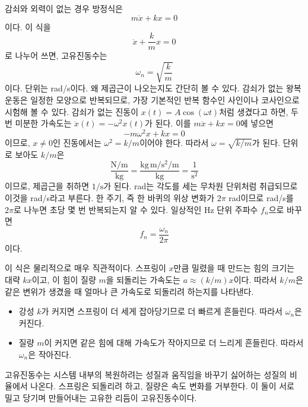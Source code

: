 감쇠와 외력이 없는 경우 방정식은
\begin{equation}
  m\ddot{x}+kx=0
\end{equation}
이다.
이 식을
\begin{equation}
  \ddot{x}+\frac{k}{m}x=0
\end{equation}
로 나누어 쓰면, 고유진동수는
\begin{equation}
  \omega_n=\sqrt{\frac{k}{m}}
\end{equation}
이다.
단위는 rad/s이다.
왜 제곱근이 나오는지도 간단히 볼 수 있다.
감쇠가 없는 왕복 운동은 일정한 모양으로 반복되므로, 가장 기본적인 반복 함수인 사인이나 코사인으로 시험해 볼 수 있다.
감쇠가 없는 진동이 $x(t)=A\cos(\omega t)$처럼 생겼다고 하면, 두 번 미분한 가속도는 $\ddot{x}(t)=-\omega^2x(t)$가 된다.
이를 $m\ddot{x}+kx=0$에 넣으면
\begin{equation}
  -m\omega^2x+kx=0
\end{equation}
이므로, $x\neq0$인 진동에서는 $\omega^2=k/m$이어야 한다.
따라서 $\omega=\sqrt{k/m}$가 된다.
단위로 보아도 $k/m$은
\begin{equation}
  \frac{\mathrm{N/m}}{\mathrm{kg}}
  =
  \frac{\mathrm{kg\,m/s^2}/\mathrm{m}}{\mathrm{kg}}
  =
  \frac{1}{\mathrm{s^2}}
\end{equation}
이므로, 제곱근을 취하면 $1/\mathrm{s}$가 된다.
rad는 각도를 세는 무차원 단위처럼 취급되므로 이것을 rad/s라고 부른다.
한 주기, 즉 한 바퀴의 위상 변화가 $2\pi$ rad이므로 rad/s를 $2\pi$로 나누면 초당 몇 번 반복되는지 알 수 있다.
일상적인 Hz 단위 주파수 $f_n$으로 바꾸면
\begin{equation}
  f_n=\frac{\omega_n}{2\pi}
\end{equation}
이다.

이 식은 물리적으로 매우 직관적이다.
스프링이 $x$만큼 밀렸을 때 만드는 힘의 크기는 대략 $kx$이고, 이 힘이 질량 $m$을 되돌리는 가속도는 $a\approx(k/m)x$이다.
따라서 $k/m$은 같은 변위가 생겼을 때 얼마나 큰 가속도로 되돌리려 하는지를 나타낸다.
\begin{itemize}
  \item 강성 $k$가 커지면 스프링이 더 세게 잡아당기므로 더 빠르게 흔들린다. 따라서 $\omega_n$은 커진다.
  \item 질량 $m$이 커지면 같은 힘에 대해 가속도가 작아지므로 더 느리게 흔들린다. 따라서 $\omega_n$은 작아진다.
\end{itemize}

고유진동수는 시스템 내부의 복원하려는 성질과 움직임을 바꾸기 싫어하는 성질의 비율에서 나온다.
스프링은 되돌리려 하고, 질량은 속도 변화를 거부한다.
이 둘이 서로 밀고 당기며 만들어내는 고유한 리듬이 고유진동수이다.

